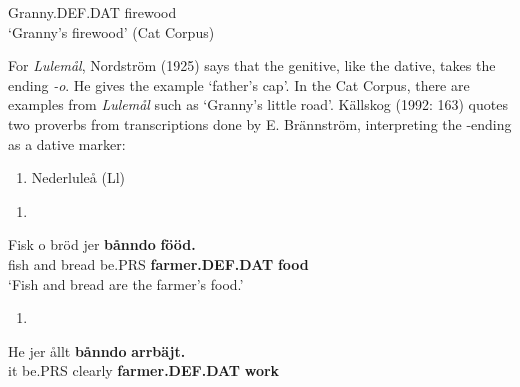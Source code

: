 Granny.DEF.DAT  firewood\\ %


‘Granny’s firewood’  (Cat Corpus)
\z


For \textit{Lulemål}, Nordström (1925) says that the genitive, like the dative, takes the ending\textit{ {}-o}. He gives the example  ‘father’s cap’. In the Cat Corpus, there are examples from \textit{Lulemål} such as  ‘Granny’s little road’.  Källskog (1992: 163) quotes two proverbs from transcriptions done by E. Brännström, interpreting the -ending as a dative marker: 

\begin{enumerate} %
\item 
Nederluleå (Ll)

\end{enumerate} %
\setcounter{listLFOxcviiileveli}{0}
\begin{enumerate} %
\item 
\end{enumerate} %
\ea\label{}
\gll Fisk  o  bröd  jer  \textbf{bånndo} \textbf{fööd.}\\


fish  and  bread  be.PRS  \textbf{farmer.DEF.DAT} \textbf{food}\\ %


‘Fish and bread are the farmer’s food.’
\z


\begin{enumerate} %
\item 
\end{enumerate} %
\ea\label{}
\gll He  jer  ållt  \textbf{bånndo} \textbf{arrbäjt.}\\


it  be.PRS  clearly  \textbf{farmer.DEF.DAT} \textbf{work}\\ %



